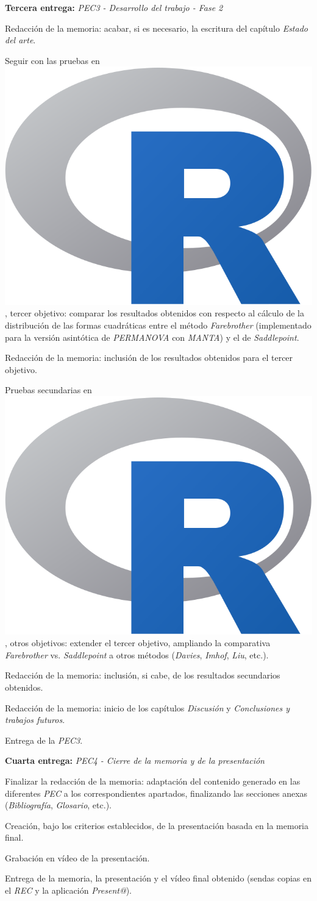 \documentclass[IB,BIB]{TFUOC}%
\newcommand{\checkbox}{\text{\fboxsep=-.15pt\fbox{\rule{0pt}{1.5ex}\rule{1.5ex}{0pt}}}} %
\newcommand{\cmark}{\ding{51}} %
\newcommand{\xmark}{\ding{55}} %
\newcommand{\progress}{\ding{46}} %
\newcommand{\done}{\rlap{\checkbox}{\raisebox{1.2pt}{\large\hspace{1pt}\cmark}}
\hspace{-2.5pt}}
\newcommand{\wontfix}{\rlap{\checkbox}{\raisebox{-1.5pt}{\large\hspace{-.75pt}\xmark}}
\hspace{-2.5pt}}
\newcommand{\Rlogo}{\protect\includegraphics[height=2.5ex,keepaspectratio]{Rlogo.png}}
\begin{document}
\begin{todolist}
  \item \textbf{Tercera entrega:} \textit{PEC3 - Desarrollo del trabajo - Fase 2}
  \begin{todolist}
  \item[\progress] Redacción de la memoria: acabar, si es necesario, la escritura del capítulo \textit{Estado del arte}.
  \item[\wontfix] Seguir con las pruebas en \hspace{-.2em}\Rlogo\hspace{+.1em}, tercer objetivo: comparar los resultados obtenidos con respecto al cálculo de la distribución de las formas cuadráticas entre el método \textit{Farebrother} (implementado para la versión asintótica de \textit{PERMANOVA} con \textit{MANTA}) y el de \textit{Saddlepoint}.
  \item[\wontfix] Redacción de la memoria: inclusión de los resultados obtenidos para el tercer objetivo.
  \item[\wontfix] Pruebas secundarias en \hspace{-.2em}\Rlogo\hspace{+.1em}, otros objetivos: extender el tercer objetivo, ampliando la comparativa \textit{Farebrother} vs. \textit{Saddlepoint} a otros métodos (\textit{Davies}, \textit{Imhof}, \textit{Liu}, etc.).
  \item[\wontfix] Redacción de la memoria: inclusión, si cabe, de los resultados secundarios obtenidos.
  \item[\progress] Redacción de la memoria: inicio de los capítulos \textit{Discusión} y \textit{Conclusiones y trabajos futuros}.
  \item[\done] Entrega de la \textit{PEC3}.
  \end{todolist}
\end{todolist}

\newpage

\begin{todolist}
  \item \textbf{Cuarta entrega:} \textit{PEC4 - Cierre de la memoria y de la presentación}
  \begin{todolist}
  \item[\progress] Finalizar la redacción de la memoria: adaptación del contenido generado en las diferentes \textit{PEC} a los correspondientes apartados, finalizando las secciones anexas (\textit{Bibliografía}, \textit{Glosario}, etc.).
  \item[\progress] Creación, bajo los criterios establecidos, de la presentación basada en la memoria final.
  \item[\progress] Grabación en vídeo de la presentación.
  \item Entrega de la memoria, la presentación y el vídeo final obtenido (sendas copias en el \textit{REC} y la aplicación \textit{Present@}).
  \end{todolist}
\end{todolist}
\end{document}
